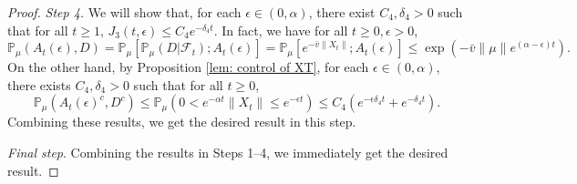 \documentclass[12pt,a4paper]{amsart}
\theoremstyle{plain}
\theoremstyle{definition}
\numberwithin{equation}{section}
\begin{document}
\begin{proof}
\emph{Step 4.}
We will show that, for each $\epsilon\in (0,  \alpha)$, there exist $C_4,\delta_4>0$ such that for all $t\geq 1$, $
J_3(t,\epsilon)\leq C_4e^{-\delta_4 t}.
$
In fact, we have  for all $t\geq 0, \epsilon >0$,
\[
  \mathbb P_{\mu}(A_{t}(\epsilon), D)
  = \mathbb P_{\mu}[\mathbb P_{\mu}(D|\mathscr F_t);A_t(\epsilon)]
  = \mathbb P_\mu[e^{-\bar v\|X_t\|};A_t(\epsilon)]
  \leq \exp({-\bar v \|\mu\|e^{(\alpha - \epsilon)t}}).
\]
On the other hand, by Proposition \ref{lem: control of XT}, for each $\epsilon \in (0, \alpha)$,
there exists  $C_{4}, \delta_{4}>0$ such that for all $t\geq 0$,
\begin{equation}
  \mathbb P_\mu(A_t(\epsilon)^c,D^c)
  \leq \mathbb P_\mu(0 < e^{-\alpha t}\|X_t\|
     \leq e^{ - \epsilon t}) \leq C_{4} (e^{-\epsilon \delta_{4} t}+e^{-\delta_{4} t}).
\end{equation}
 Combining these results, we get the desired result in this step.

 \emph{Final step}. Combining the results in Steps 1--4, we immediately get the desired result.
\end{proof}
\end{document}
